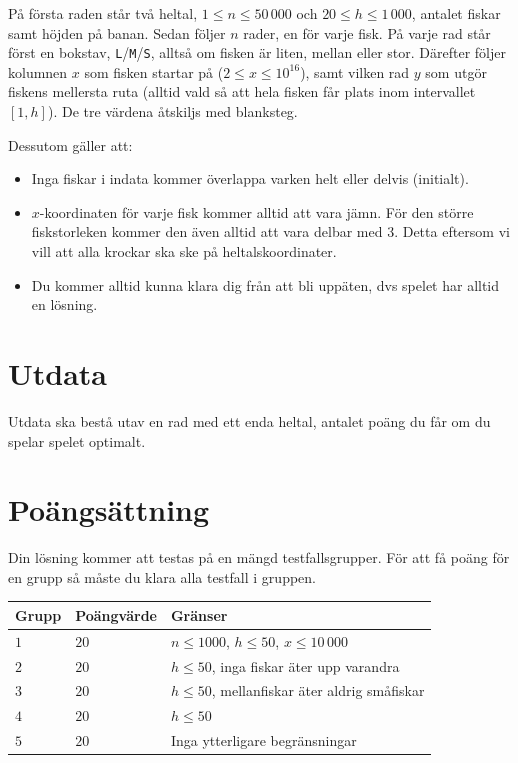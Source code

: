 På första raden står två heltal, $1 \leq n \leq 50\,000$ och $20 \leq
h \leq 1\,000$, antalet fiskar samt höjden på banan. Sedan följer $n$ rader,
en för varje fisk. På varje rad står först en bokstav, \texttt{L}/\texttt{M}/\texttt{S}, alltså om fisken är liten, mellan eller stor. Därefter följer kolumnen $x$ som fisken startar på ($2 \leq x \leq 10^{16}$), samt vilken rad $y$ som utgör fiskens mellersta ruta (alltid vald så att hela fisken får plats inom intervallet $[1, h]$). De tre värdena åtskiljs med blanksteg.

Dessutom gäller att:
\begin{itemize}
  \item
    Inga fiskar i indata kommer överlappa varken helt eller delvis (initialt).
  \item
      $x$-koordinaten för varje fisk kommer alltid att vara jämn. För den större
      fiskstorleken kommer den även alltid att vara delbar med 3. Detta
      eftersom vi vill att alla krockar ska ske på heltalskoordinater.
  \item
    Du kommer alltid kunna klara dig från att bli uppäten, dvs spelet har
    alltid en lösning.
\end{itemize}

\section*{Utdata}
Utdata ska bestå utav en rad med ett enda heltal, antalet poäng du får om du spelar spelet optimalt.

\section*{Poängsättning}
Din lösning kommer att testas på en mängd testfallsgrupper.
För att få poäng för en grupp så måste du klara alla testfall i gruppen.

\noindent
\begin{tabular}{| l | l | l |}
  \hline
  Grupp & Poängvärde & Gränser \\ \hline
  $1$   & $20$       & $n \leq 1000$, $h \leq 50$, $x \leq 10\,000$ \\ \hline
  $2$   & $20$       & $h \leq 50$, inga fiskar äter upp varandra \\ \hline
  $3$   & $20$       & $h \leq 50$, mellanfiskar äter aldrig småfiskar \\ \hline
  $4$   & $20$       & $h \leq 50$ \\ \hline
  $5$   & $20$       & Inga ytterligare begränsningar \\ \hline
\end{tabular}
